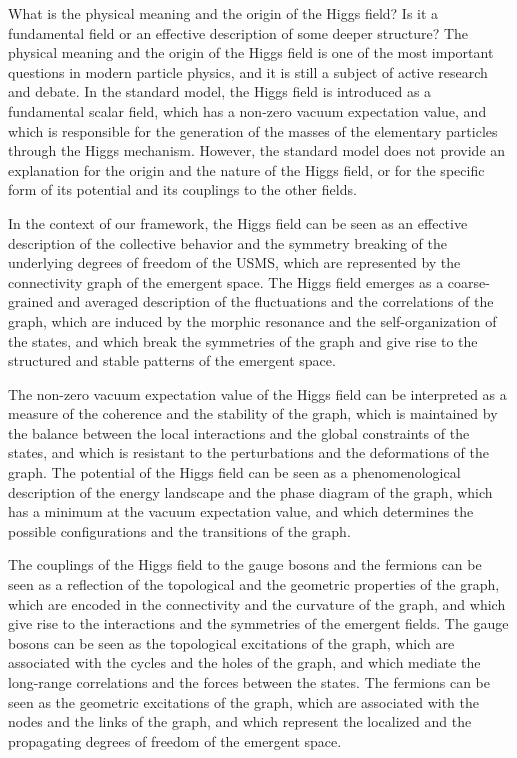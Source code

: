 \begin{tcolorbox}[colback=green!5!white,colframe=green!75!black,title=Question]
    What is the physical meaning and the origin of the Higgs field? Is it a fundamental field or an effective description of some deeper structure?
    \tcblower
    The physical meaning and the origin of the Higgs field is one of the most important questions in modern particle physics, and it is still a subject of active research and debate. In the standard model, the Higgs field is introduced as a fundamental scalar field, which has a non-zero vacuum expectation value, and which is responsible for the generation of the masses of the elementary particles through the Higgs mechanism. However, the standard model does not provide an explanation for the origin and the nature of the Higgs field, or for the specific form of its potential and its couplings to the other fields.

    In the context of our framework, the Higgs field can be seen as an effective description of the collective behavior and the symmetry breaking of the underlying degrees of freedom of the USMS, which are represented by the connectivity graph of the emergent space. The Higgs field emerges as a coarse-grained and averaged description of the fluctuations and the correlations of the graph, which are induced by the morphic resonance and the self-organization of the states, and which break the symmetries of the graph and give rise to the structured and stable patterns of the emergent space.

    The non-zero vacuum expectation value of the Higgs field can be interpreted as a measure of the coherence and the stability of the graph, which is maintained by the balance between the local interactions and the global constraints of the states, and which is resistant to the perturbations and the deformations of the graph. The potential of the Higgs field can be seen as a phenomenological description of the energy landscape and the phase diagram of the graph, which has a minimum at the vacuum expectation value, and which determines the possible configurations and the transitions of the graph.

    The couplings of the Higgs field to the gauge bosons and the fermions can be seen as a reflection of the topological and the geometric properties of the graph, which are encoded in the connectivity and the curvature of the graph, and which give rise to the interactions and the symmetries of the emergent fields. The gauge bosons can be seen as the topological excitations of the graph, which are associated with the cycles and the holes of the graph, and which mediate the long-range correlations and the forces between the states. The fermions can be seen as the geometric excitations of the graph, which are associated with the nodes and the links of the graph, and which represent the localized and the propagating degrees of freedom of the emergent space.


\end{tcolorbox}
